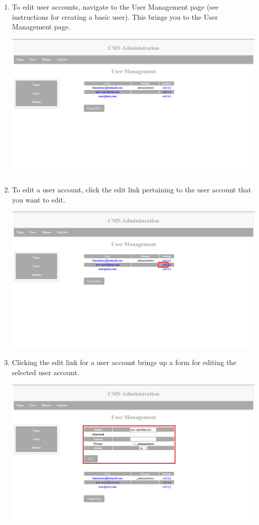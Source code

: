 \documentclass[12pt]{article}
\begin{document}
\begin{enumerate}
  \item To edit user accounts, navigate to the User Management page (see instructions for creating a basic user). This brings you to the User Management page.
  
  \includegraphics[width=\textwidth,height=\textheight,keepaspectratio]{pics/editUser_1.png}
  
  
  \item To edit a user account, click the edit link pertaining to the user account that you want to edit.
  
  \includegraphics[width=\textwidth,height=\textheight,keepaspectratio]{pics/editUser_2.png}
  
  \item Clicking the edit link for a user account brings up a form for editing the selected user account.
  
  \includegraphics[width=\textwidth,height=\textheight,keepaspectratio]{pics/editUser_3.png}
  

\end{enumerate}
\end{document}
